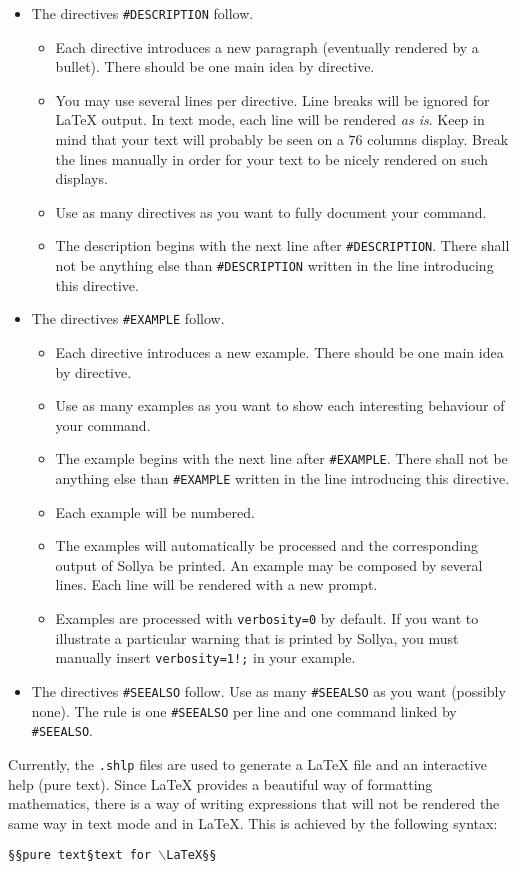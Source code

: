 \documentclass{article}
\begin{document}
\begin{itemize}
\item The directives \texttt{\#DESCRIPTION} follow.
  \begin{itemize}
  \item Each directive introduces a new paragraph (eventually rendered by a bullet). There should be one main idea by directive.
  \item You may use several lines per directive. Line breaks will be ignored for \LaTeX{} output. In text mode, each line will be rendered \emph{as is}. Keep in mind that your text will probably be seen on a $76$ columns display. Break the lines manually in order for your text to be nicely rendered on such displays.
  \item Use as many directives as you want to fully document your command.
  \item The description begins with the next line after \texttt{\#DESCRIPTION}. There shall not be anything else than \texttt{\#DESCRIPTION} written in the line introducing this directive.
  \end{itemize}
\item The directives \texttt{\#EXAMPLE} follow.
  \begin{itemize}
  \item Each directive introduces a new example. There should be one main idea by directive.
  \item Use as many examples as you want to show each interesting behaviour of your command.
  \item The example begins with the next line after \texttt{\#EXAMPLE}. There shall not be anything else than \texttt{\#EXAMPLE} written in the line introducing this directive.
  \item Each example will be numbered.
  \item The examples will automatically be processed and the corresponding output of Sollya be printed. An example may be composed by several lines. Each line will be rendered with a new prompt.
  \item Examples are processed with \texttt{verbosity=0} by default. If you want to illustrate a particular warning that is printed by Sollya, you must manually insert \texttt{verbosity=1!;} in your example.
  \end{itemize}
\item The directives \texttt{\#SEEALSO} follow. Use as many \texttt{\#SEEALSO} as you want (possibly none). The rule is one \texttt{\#SEEALSO} per line and one command linked by \texttt{\#SEEALSO}.
\end{itemize}

Currently, the \texttt{.shlp} files are used to generate a \LaTeX{} file and an interactive help (pure text). Since \LaTeX{} provides a beautiful way of formatting mathematics, there is a way of writing expressions that will not be rendered the same way in text mode and in \LaTeX. This is achieved by the following syntax:
\begin{center}
  \texttt{§§pure text§text for }$\backslash$\texttt{LaTeX§§}
\end{center}
\end{document}
